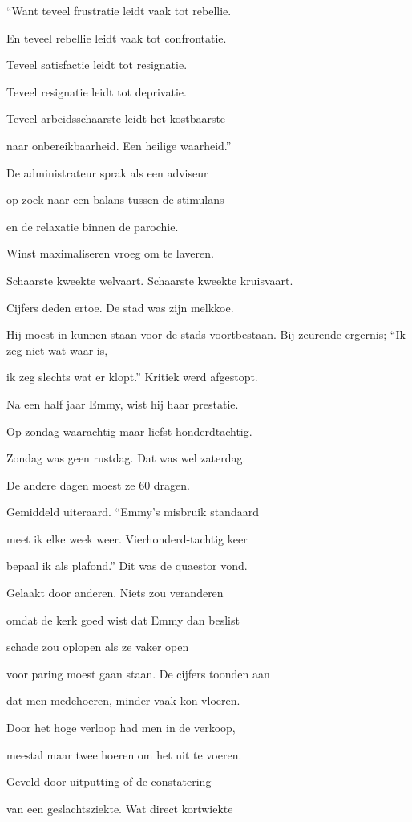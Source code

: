 “Want teveel frustratie
leidt vaak tot rebellie.

En teveel rebellie
leidt vaak tot confrontatie.

Teveel satisfactie
leidt tot resignatie.

Teveel resignatie
leidt tot deprivatie.

Teveel arbeidsschaarste
leidt het kostbaarste

naar onbereikbaarheid.
Een heilige waarheid.”

De administrateur
sprak als een adviseur

op zoek naar een balans
tussen de stimulans

en de relaxatie
binnen de parochie.

Winst maximaliseren
vroeg om te laveren.

Schaarste kweekte welvaart.
Schaarste kweekte kruisvaart.

Cijfers deden ertoe.
De stad was zijn melkkoe.

Hij moest in kunnen staan
voor de stads voortbestaan.
Bij zeurende ergernis;
“Ik zeg niet wat waar is,

ik zeg slechts wat er klopt.”
Kritiek werd afgestopt.

Na een half jaar Emmy,
wist hij haar prestatie.

Op zondag waarachtig
maar liefst honderdtachtig.

Zondag was geen rustdag.
Dat was wel zaterdag.

De andere dagen
moest ze 60 dragen.

Gemiddeld uiteraard.
“Emmy’s misbruik standaard

meet ik elke week weer.
Vierhonderd-tachtig keer

bepaal ik als plafond.”
Dit was de quaestor vond.

Gelaakt door anderen.
Niets zou veranderen

omdat de kerk goed wist
dat Emmy dan beslist

schade zou oplopen
als ze vaker open

voor paring moest gaan staan.
De cijfers toonden aan

dat men medehoeren,
minder vaak kon vloeren.

Door het hoge verloop
had men in de verkoop,

meestal maar twee hoeren
om het uit te voeren.

Geveld door uitputting
of de constatering

van een geslachtsziekte.
Wat direct kortwiekte

